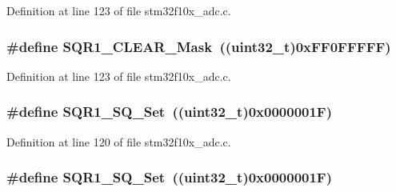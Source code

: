 Definition at line 123 of file stm32f10x\+\_\+adc.\+c.

\subsubsection[{\texorpdfstring{S\+Q\+R1\+\_\+\+C\+L\+E\+A\+R\+\_\+\+Mask}{SQR1_CLEAR_Mask}}]{\setlength{\rightskip}{0pt plus 5cm}\#define S\+Q\+R1\+\_\+\+C\+L\+E\+A\+R\+\_\+\+Mask~(({\bf uint32\+\_\+t})0x\+F\+F0\+F\+F\+F\+F\+F)}\hypertarget{group___a_d_c___private___defines_ga6e3e238f38d7ff17939cbd5417fc51cc}{}\label{group___a_d_c___private___defines_ga6e3e238f38d7ff17939cbd5417fc51cc}


Definition at line 123 of file stm32f10x\+\_\+adc.\+c.

\subsubsection[{\texorpdfstring{S\+Q\+R1\+\_\+\+S\+Q\+\_\+\+Set}{SQR1_SQ_Set}}]{\setlength{\rightskip}{0pt plus 5cm}\#define S\+Q\+R1\+\_\+\+S\+Q\+\_\+\+Set~(({\bf uint32\+\_\+t})0x0000001\+F)}\hypertarget{group___a_d_c___private___defines_ga91fb5f63b765a543dfa419ea0219351b}{}\label{group___a_d_c___private___defines_ga91fb5f63b765a543dfa419ea0219351b}


Definition at line 120 of file stm32f10x\+\_\+adc.\+c.

\subsubsection[{\texorpdfstring{S\+Q\+R1\+\_\+\+S\+Q\+\_\+\+Set}{SQR1_SQ_Set}}]{\setlength{\rightskip}{0pt plus 5cm}\#define S\+Q\+R1\+\_\+\+S\+Q\+\_\+\+Set~(({\bf uint32\+\_\+t})0x0000001\+F)}\hypertarget{group___a_d_c___private___defines_ga91fb5f63b765a543dfa419ea0219351b}{}\label{group___a_d_c___private___defines_ga91fb5f63b765a543dfa419ea0219351b}


